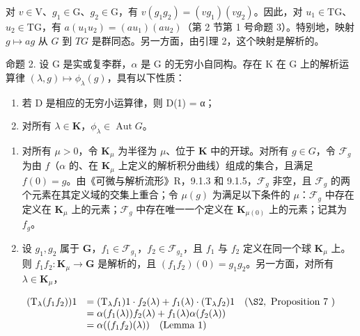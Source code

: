 对 \(v \in \mathrm{V}\)、\(g_1 \in \mathrm{G}\)、\(g_2 \in \mathrm{G}\)，有 \(v(g_1g_2) = (vg_1)(vg_2)\)。因此，对 \(u_1 \in \mathrm{TG}\)、\(u_2 \in \mathrm{TG}\)，有 \(a(u_1u_2) = (au_1)(au_2)\)（第 2 节第 1 号命题 3）。特别地，映射 \(g \mapsto ag\) 从 \(G\) 到 \(TG\) 是群同态。另一方面，由引理 2，这个映射是解析的。

命题 2. 设 G 是实或复李群，\(\alpha\) 是 G 的无穷小自同构。存在 K 在 G 上的解析运算律 \((\lambda, g) \mapsto \phi_{\lambda}(g)\)，具有以下性质：

\begin{enumerate}
\def\labelenumi{(\arabic{enumi})}
\item
  若 D 是相应的无穷小运算律，则 D(1) = α；
\item
  对所有 \(\lambda \in \mathbf{K}\)，\(\phi_{\lambda} \in \operatorname{Aut} G\)。
\end{enumerate}

\begin{enumerate}
\def\labelenumi{(\alph{enumi})}
\item
  对所有 \(\mu > 0\)，令 \(\mathbf{K}_{\mu}\) 为半径为 \(\mu\)、位于 \(\mathbf{K}\) 中的开球。对所有 \(g \in G\)，令 \(\mathcal{F}_g\) 为由 \(f\)（\(\alpha\) 的、在 \(\mathbf{K}_{\mu}\) 上定义的解析积分曲线）组成的集合，且满足 \(f(0) = g\)。由《可微与解析流形》R，9.1.3 和 9.1.5，\(\mathcal{F}_g\) 非空，且 \(\mathcal{F}_g\) 的两个元素在其定义域的交集上重合；令 \(\mu(g)\) 为满足以下条件的 \(\mu\)：\(\mathcal{F}_g\) 中存在定义在 \(\mathbf{K}_{\mu}\) 上的元素；\(\mathcal{F}_g\) 中存在唯一一个定义在 \(\mathbf{K}_{\mu(0)}\) 上的元素；记其为 \(f_g\)。
\item
  设 \(g_1, g_2\) 属于 \(\mathbf{G}\)，\(f_1 \in \mathcal{F}_{g_1}\)，\(f_2 \in \mathcal{F}_{g_2}\)，且 \(f_1\) 与 \(f_2\) 定义在同一个球 \(\mathbf{K}_\mu\) 上。则 \(f_1f_2: \mathbf{K}_\mu \to \mathbf{G}\) 是解析的，且 \((f_1f_2)(0) = g_1g_2\)。另一方面，对所有 \(\lambda \in \mathbf{K}_\mu\)，
\end{enumerate}

\[
\begin{array}{r l} (\mathrm{T} _ {\lambda} (f _ {1} f _ {2})) 1 & = (\mathrm{T} _ {\lambda} f _ {1}) 1 \cdot f _ {2} (\lambda) + f _ {1} (\lambda) \cdot (\mathrm{T} _ {\lambda} f _ {2}) 1 \quad (\S 2, \text { Proposition   7 }) \\ & = \alpha (f _ {1} (\lambda)) f _ {2} (\lambda) + f _ {1} (\lambda) \alpha (f _ {2} (\lambda)) \\ & = \alpha ((f _ {1} f _ {2}) (\lambda)) \quad \text {(Lemma   1)} \end{array}
\]

